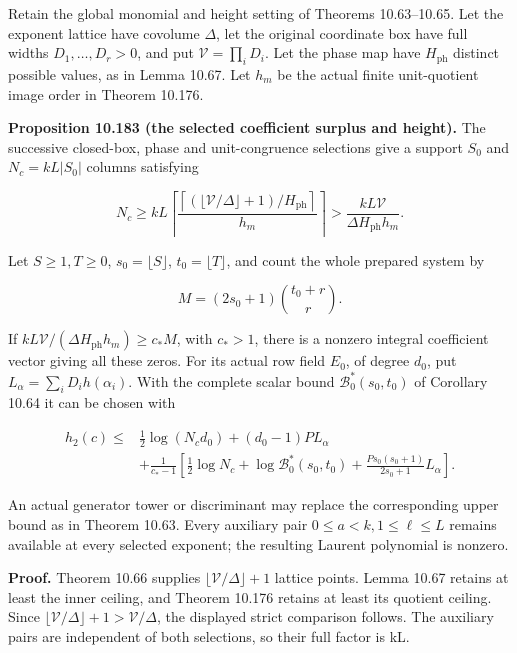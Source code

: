\documentclass[
  11pt,
  a4paper,
]{article}
\begin{document}
Retain the global monomial and height setting of Theorems 10.63--10.65.
Let the exponent lattice have covolume \(\Delta\), let the original
coordinate box have full widths \(D_1,\ldots,D_r>0\), and put
\(\mathcal V=\prod_iD_i\). Let the phase map have \(H_{\mathrm{ph}}\)
distinct possible values, as in Lemma 10.67. Let \(h_m\) be the actual
finite unit-quotient image order in Theorem 10.176.

\textbf{Proposition 10.183 (the selected coefficient surplus and
height).} The successive closed-box, phase and unit-congruence
selections give a support \(S_0\) and \(N_c=kL|S_0|\) columns satisfying

\[
N_c\ge kL\left\lceil
 \frac{\left\lceil(\lfloor\mathcal V/\Delta\rfloor+1)/H_{\mathrm{ph}}\right\rceil}
      {h_m}\right\rceil
>\frac{kL\mathcal V}{\Delta H_{\mathrm{ph}}h_m}.
\tag{10.694}
\]

Let \(S\ge1,T\ge0\), \(s_0=\lfloor S\rfloor\), \(t_0=\lfloor T\rfloor\),
and count the whole prepared system by

\[
M=(2s_0+1)\binom{t_0+r}{r}.
\tag{10.695}
\]

If \(kL\mathcal V/(\Delta H_{\mathrm{ph}}h_m)\ge c_*M\), with \(c_*>1\),
there is a nonzero integral coefficient vector giving all these zeros.
For its actual row field \(E_0\), of degree \(d_0\), put
\(L_\alpha=\sum_iD_i h(\alpha_i)\). With the complete scalar bound
\(\mathcal B_0^*(s_0,t_0)\) of Corollary 10.64 it can be chosen with

\[
\begin{aligned}
h_2(c)\le{}&\frac12\log(N_cd_0)+(d_0-1)P L_\alpha\\
&+\frac1{c_*-1}\left[
 \frac12\log N_c+\log\mathcal B_0^*(s_0,t_0)
 +\frac{Ps_0(s_0+1)}{2s_0+1}L_\alpha\right].
\end{aligned}
\tag{10.696}
\]

An actual generator tower or discriminant may replace the corresponding
upper bound as in Theorem 10.63. Every auxiliary pair
\(0\le a<k,1\le\ell\le L\) remains available at every selected exponent;
the resulting Laurent polynomial is nonzero.

\textbf{Proof.} Theorem 10.66 supplies
\(\lfloor\mathcal V/\Delta\rfloor+1\) lattice points. Lemma 10.67
retains at least the inner ceiling, and Theorem 10.176 retains at least
its quotient ceiling. Since
\(\lfloor\mathcal V/\Delta\rfloor+1>\mathcal V/\Delta\), the displayed
strict comparison follows. The auxiliary pairs are independent of both
selections, so their full factor is kL.
\end{document}
